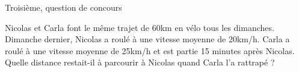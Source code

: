 Troisième, question de concours

Nicolas et Carla font le même trajet de 60km en vélo tous les dimanches.
Dimanche dernier, Nicolas a roulé à une vitesse moyenne de 20km/h. Carla a roulé à une vitesse moyenne de 25km/h et est partie 15 minutes après Nicolas. Quelle distance restait-il à parcourir à Nicolas quand Carla l'a rattrapé ?